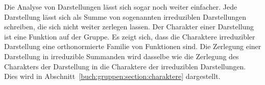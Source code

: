Die Analyse von Darstellungen lässt sich sogar noch weiter einfacher.
Jede Darstellung lässt sich als Summe von sogenannten irreduziblen
Darstellungen schreiben, die sich nicht weiter zerlegen lassen.
Der Charakter einer Darstellung ist eine Funktion auf der Gruppe.
Es zeigt sich, dass die Charaktere irreduzibler Darstellung eine 
orthonormierte Familie von Funktionen sind.
Die Zerlegung einer Darstellung in irreduzible Summanden wird
dasselbe wie die Zerlegung des Charakters der Darstellung in die
Charaktere der irreduziblen Darstellungen.
Dies wird in Abschnitt~\ref{buch:gruppen:section:charaktere}
dargestellt.











